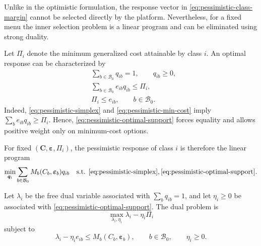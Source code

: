 \documentclass{article}
\begin{document}
Unlike in the optimistic formulation, the response vector in
\eqref{eq:pessimistic-class-margin} cannot be selected directly by the
platform. Nevertheless, for a fixed menu the inner selection problem is
a linear program and can be eliminated using strong duality.

Let $\Pi_i$ denote the minimum generalized cost attainable by class $i$.
An optimal response can be characterized by
\begin{align}
    &\sum_{b\in\mathcal B_0}q_{ib}=1,
    \qquad
    q_{ib}\geq0,
    \label{eq:pessimistic-simplex}\\
    &\sum_{b\in\mathcal B_0}
    e_{ib}q_{ib}
    \leq
    \Pi_i,
    \label{eq:pessimistic-optimal-support}\\
    &\Pi_i\leq e_{ib},
    \qquad
    b\in\mathcal B_0.
    \label{eq:pessimistic-min-cost}
\end{align}
Indeed, \eqref{eq:pessimistic-simplex} and
\eqref{eq:pessimistic-min-cost} imply
$\sum_b e_{ib}q_{ib}\geq\Pi_i$. Hence,
\eqref{eq:pessimistic-optimal-support} forces equality and allows
positive weight only on minimum-cost options.

For fixed $(\bm C,\bm\varepsilon,\Pi_i)$, the pessimistic response of
class $i$ is therefore the linear program
\begin{equation}
    \min_{\bm q_i}
    \sum_{b\in\mathcal B_0}
    M_b(C_b,\bm\varepsilon_b)q_{ib}
    \quad
    \text{s.t. }
    \eqref{eq:pessimistic-simplex},
    \eqref{eq:pessimistic-optimal-support}.
    \label{eq:pessimistic-inner-lp}
\end{equation}

Let $\lambda_i$ be the free dual variable associated with
$\sum_bq_{ib}=1$, and let $\eta_i\geq0$ be associated with
\eqref{eq:pessimistic-optimal-support}. The dual problem is
\begin{equation}
    \max_{\lambda_i,\eta_i}
    \lambda_i-\eta_i\Pi_i
    \label{eq:pessimistic-inner-dual}
\end{equation}
subject to
\begin{equation}
    \lambda_i-\eta_i e_{ib}
    \leq
    M_b(C_b,\bm\varepsilon_b),
    \qquad
    b\in\mathcal B_0,
    \qquad
    \eta_i\geq0.
    \label{eq:pessimistic-dual-feasibility}
\end{equation}
\end{document}
